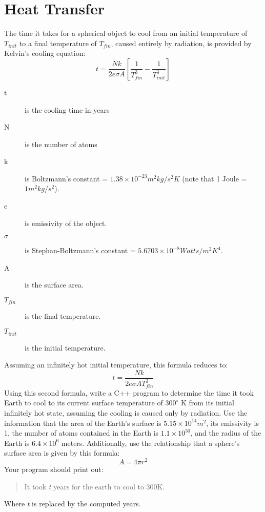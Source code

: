 \documentclass{article}
\begin{document}
\section*{Heat Transfer}
The time it takes for a spherical object to cool from an initial temperature of $T_{init}$ to a final temperature of $T_{fin}$, caused entirely by radiation, is provided by Kelvin’s cooling equation:
\begin{equation}
	t = \frac{Nk}{2e\sigma A}\left[ \frac{1}{T_{fin}^{3}} - \frac{1}{T_{init}^{3}}\right ]
\end{equation}
	\begin{description}
		\item[t] is the cooling time in years
		\item[N] is the number of atoms
		\item[k] is Boltzmann’s constant = $1.38 \times 10^{-23} m^{2}kg/s^{2}K$ (note that 1 Joule = $1 m^{2}kg/s^{2}$).
		\item[e] is emissivity of the object.
		\item[$\sigma$] is Stephan-Boltzmann’s constant = $5.6703 \times 10^{-8} Watts/m^{2}K^{4}$.
		\item[A] is the surface area.
		\item[$T_{fin}$] is the final temperature.
		\item[$T_{init}$] is the initial temperature.
	\end{description}
Assuming an infinitely hot initial temperature, this formula reduces to:
	\begin{equation}
		t = \frac{Nk}{2e\sigma A T_{fin}^{3}}
	\end{equation}
Using this second formula, write a C++ program to determine the time it took Earth to cool to its current surface temperature of $300^{\circ}$ K from its initial infinitely hot state, assuming the cooling is caused only by radiation. Use the information that the area of the Earth’s surface is $5.15 \times 10^{14}m^{2}$, its emissivity is 1, the number of atoms contained in the Earth is $1.1 \times 10^{50}$, and the radius of the Earth is $6.4 \times 10^{6}$ meters. Additionally, use the relationship that a sphere’s surface area is given by this formula:
\begin{equation}
	A = 4 \pi r^{2}
\end{equation}
Your program should print out: 
	\begin{quote}
		It took \textit{t} years for the earth to cool to 300K.  
	\end{quote}
Where \textit{t} is replaced by the computed years.
\end{document}

